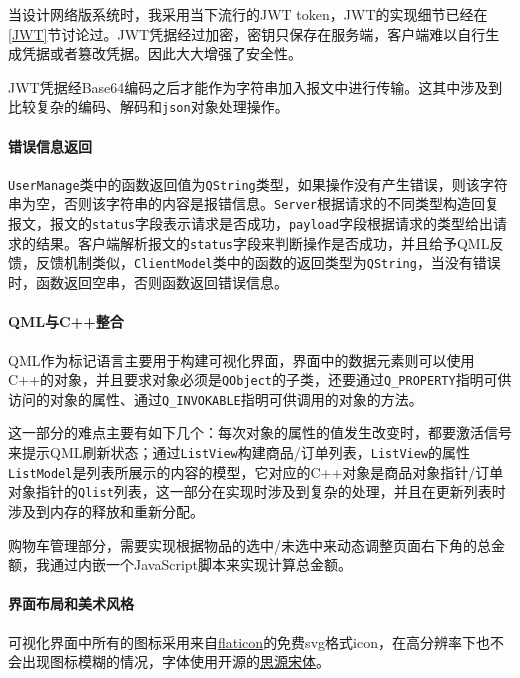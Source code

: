 \documentclass[lang=cn,11pt,a4paper,cite=authornum]{paper}
\begin{document}
当设计网络版系统时，我采用当下流行的JWT token，JWT的实现细节已经在\ref{JWT}节讨论过。JWT凭据经过加密，密钥只保存在服务端，客户端难以自行生成凭据或者篡改凭据。因此大大增强了安全性。

JWT凭据经Base64编码之后才能作为字符串加入报文中进行传输。这其中涉及到比较复杂的编码、解码和\texttt{json}对象处理操作。

\paragraph{错误信息返回} \texttt{UserManage}类中的函数返回值为\texttt{QString}类型，如果操作没有产生错误，则该字符串为空，否则该字符串的内容是报错信息。\texttt{Server}根据请求的不同类型构造回复报文，报文的\texttt{status}字段表示请求是否成功，\texttt{payload}字段根据请求的类型给出请求的结果。客户端解析报文的\texttt{status}字段来判断操作是否成功，并且给予QML反馈，反馈机制类似，\texttt{ClientModel}类中的函数的返回类型为\texttt{QString}，当没有错误时，函数返回空串，否则函数返回错误信息。

\paragraph{QML与C++整合} QML作为标记语言主要用于构建可视化界面，界面中的数据元素则可以使用C++的对象，并且要求对象必须是\texttt{QObject}的子类，还要通过\texttt{Q_PROPERTY}指明可供访问的对象的属性、通过\texttt{Q_INVOKABLE}指明可供调用的对象的方法。

这一部分的难点主要有如下几个：每次对象的属性的值发生改变时，都要激活信号来提示QML刷新状态；通过\texttt{ListView}构建商品/订单列表，\texttt{ListView}的属性\texttt{ListModel}是列表所展示的内容的模型，它对应的C++对象是商品对象指针/订单对象指针的\texttt{Qlist}列表，这一部分在实现时涉及到复杂的处理，并且在更新列表时涉及到内存的释放和重新分配。

购物车管理部分，需要实现根据物品的选中/未选中来动态调整页面右下角的总金额，我通过内嵌一个JavaScript脚本来实现计算总金额。

\paragraph{界面布局和美术风格} 可视化界面中所有的图标采用来自\href{https://www.flaticon.com/}{flaticon}的免费svg格式icon，在高分辨率下也不会出现图标模糊的情况，字体使用开源的\href{https://source.typekit.com/source-han-serif/cn/}{思源宋体}。
\end{document}
